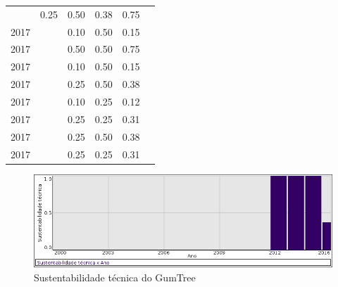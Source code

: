 \begin{table}[H]
\begin{tabular}{| l | c | c | c | c | c |}
          &
          0.25
          &
          0.50
          &
          0.38
          &
            {\color{blue} 0.75}
          \\
            2017
          &
          
          &
          0.10
          &
          0.50
          &
          0.15
          &
          \\
            2017
          &
          
          &
          0.50
          &
          0.50
          &
          0.75
          &
          \\
            2017
          &
          
          &
          0.10
          &
          0.50
          &
          0.15
          &
          \\
            2017
          &
          
          &
          0.25
          &
          0.50
          &
          0.38
          &
          \\
            2017
          &
          
          &
          0.10
          &
          0.25
          &
          0.12
          &
          \\
            2017
          &
          
          &
          0.25
          &
          0.25
          &
          0.31
          &
          \\
            2017
          &
          
          &
          0.25
          &
          0.50
          &
          0.38
          &
          \\
            2017
          &
          
          &
          0.25
          &
          0.25
          &
          0.31
          &
          \\
\hline
\end{tabular}
\end{table}

\begin{figure}[h]
  \center
  \includegraphics[scale=0.50]{imagens/softwares-charts/gumtree.png}
  \caption{Sustentabilidade técnica do GumTree}
\end{figure}


